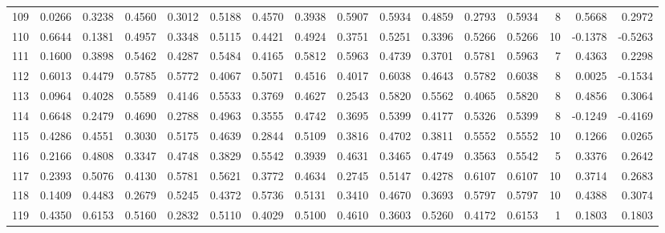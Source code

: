 \begin{tabular}{lrrrrrrrrrrrrrrr}
109 &      0.0266 &  0.3238 &  0.4560 &  0.3012 &  0.5188 &  0.4570 &  0.3938 &  0.5907 &  0.5934 &  0.4859 &   0.2793 &     0.5934 &      8 &                    0.5668 &                     0.2972 \\
110 &      0.6644 &  0.1381 &  0.4957 &  0.3348 &  0.5115 &  0.4421 &  0.4924 &  0.3751 &  0.5251 &  0.3396 &   0.5266 &     0.5266 &     10 &                   -0.1378 &                    -0.5263 \\
111 &      0.1600 &  0.3898 &  0.5462 &  0.4287 &  0.5484 &  0.4165 &  0.5812 &  0.5963 &  0.4739 &  0.3701 &   0.5781 &     0.5963 &      7 &                    0.4363 &                     0.2298 \\
112 &      0.6013 &  0.4479 &  0.5785 &  0.5772 &  0.4067 &  0.5071 &  0.4516 &  0.4017 &  0.6038 &  0.4643 &   0.5782 &     0.6038 &      8 &                    0.0025 &                    -0.1534 \\
113 &      0.0964 &  0.4028 &  0.5589 &  0.4146 &  0.5533 &  0.3769 &  0.4627 &  0.2543 &  0.5820 &  0.5562 &   0.4065 &     0.5820 &      8 &                    0.4856 &                     0.3064 \\
114 &      0.6648 &  0.2479 &  0.4690 &  0.2788 &  0.4963 &  0.3555 &  0.4742 &  0.3695 &  0.5399 &  0.4177 &   0.5326 &     0.5399 &      8 &                   -0.1249 &                    -0.4169 \\
115 &      0.4286 &  0.4551 &  0.3030 &  0.5175 &  0.4639 &  0.2844 &  0.5109 &  0.3816 &  0.4702 &  0.3811 &   0.5552 &     0.5552 &     10 &                    0.1266 &                     0.0265 \\
116 &      0.2166 &  0.4808 &  0.3347 &  0.4748 &  0.3829 &  0.5542 &  0.3939 &  0.4631 &  0.3465 &  0.4749 &   0.3563 &     0.5542 &      5 &                    0.3376 &                     0.2642 \\
117 &      0.2393 &  0.5076 &  0.4130 &  0.5781 &  0.5621 &  0.3772 &  0.4634 &  0.2745 &  0.5147 &  0.4278 &   0.6107 &     0.6107 &     10 &                    0.3714 &                     0.2683 \\
118 &      0.1409 &  0.4483 &  0.2679 &  0.5245 &  0.4372 &  0.5736 &  0.5131 &  0.3410 &  0.4670 &  0.3693 &   0.5797 &     0.5797 &     10 &                    0.4388 &                     0.3074 \\
119 &      0.4350 &  0.6153 &  0.5160 &  0.2832 &  0.5110 &  0.4029 &  0.5100 &  0.4610 &  0.3603 &  0.5260 &   0.4172 &     0.6153 &      1 &                    0.1803 &                     0.1803 \\

\end{tabular}

